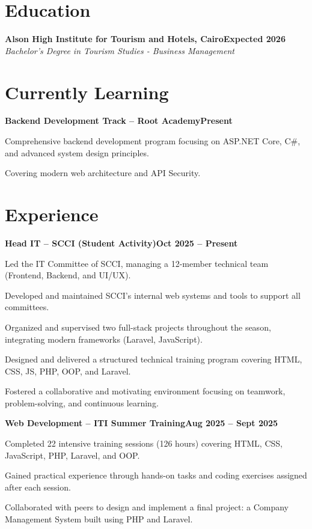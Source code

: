 \documentclass[letterpaper,10pt]{article}
\newcommand{\headingBf}[2]{\hspace{10pt}\textbf{#1}\hfill\textbf{#2}\\}
\newcommand{\headingIt}[2]{\hspace{10pt}\textit{#1}\hfill\textit{#2}\\}
\newenvironment{resume_list}{
  \vspace{-7pt}
  \begin{itemize}[itemsep=-2px, parsep=1pt, leftmargin=30pt]
}{
  \end{itemize}
}
\begin{document}
\section{Education}
\headingBf{Alson High Institute for Tourism and Hotels, Cairo}{Expected 2026}
\headingIt{Bachelor's Degree in Tourism Studies - Business Management}{}

\section{Currently Learning}
\headingBf{Backend Development Track -- Root Academy}{Present}
\begin{resume_list}
  \item Comprehensive backend development program focusing on ASP.NET Core, C\#, and advanced system design principles.
  \item Covering modern web architecture and API Security.
\end{resume_list}

\section{Experience}

\headingBf{Head IT -- SCCI (Student Activity)}{Oct 2025 -- Present}
\begin{resume_list}
  \item Led the IT Committee of SCCI, managing a 12-member technical team (Frontend, Backend, and UI/UX).
  \item Developed and maintained SCCI's internal web systems and tools to support all committees.
  \item Organized and supervised two full-stack projects throughout the season, integrating modern frameworks (Laravel, JavaScript).
  \item Designed and delivered a structured technical training program covering HTML, CSS, JS, PHP, OOP, and Laravel.
  \item Fostered a collaborative and motivating environment focusing on teamwork, problem-solving, and continuous learning.
\end{resume_list}

\headingBf{Web Development -- ITI Summer Training}{Aug 2025 -- Sept 2025}
\begin{resume_list}
  \item Completed 22 intensive training sessions (126 hours) covering HTML, CSS, JavaScript, PHP, Laravel, and OOP.
  \item Gained practical experience through hands-on tasks and coding exercises assigned after each session.
  \item Collaborated with peers to design and implement a final project: a Company Management System built using PHP and Laravel.
\end{resume_list}
\end{document}
